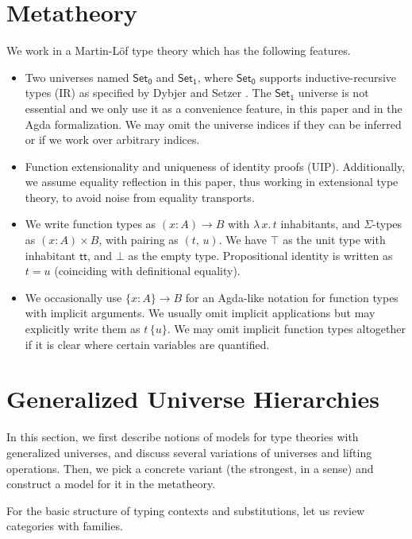\documentclass[a4paper,UKenglish,cleveref, autoref, thm-restate]{lipics-v2021}
\theoremstyle{remark}
\theoremstyle{definition}
\newcommand{\Set}[1]{\mathsf{Set_{#1}}}
\renewcommand{\tt}{\mathsf{tt}}
\begin{document}
\section{Metatheory}
\label{sec:metatheory}

We work in a Martin-Löf type theory which has the following features.
\begin{itemize}
  \item Two universes named $\Set0$ and $\Set1$, where $\Set0$ supports
    inductive-recursive types (IR) as specified by Dybjer and Setzer
    \cite{dybjer99finite}. The $\Set1$ universe is not essential and we only use
    it as a convenience feature, in this paper and in the Agda formalization. We
    may omit the universe indices if they can be inferred or if we work over
    arbitrary indices.
  \item Function extensionality and uniqueness of identity proofs
    (UIP). Additionally, we assume equality reflection in this paper, thus
    working in extensional type theory, to avoid noise from equality transports.
  \item We write function types as $(x : A)\to B$ with $\lambda\,x.\,t$
    inhabitants, and $\Sigma$-types as $(x : A) \times B$, with pairing as
    $(t,\, u)$. We have $\top$ as the unit type with inhabitant $\tt$, and
    $\bot$ as the empty type. Propositional identity is written as $t = u$
    (coinciding with definitional equality).
  \item We occasionally use $\{x : A\} \to B$ for an Agda-like notation for
    function types with implicit arguments. We usually omit implicit
    applications but may explicitly write them as $t\,\{u\}$.  We may omit
    implicit function types altogether if it is clear where certain variables
    are quantified.
\end{itemize}

\section{Generalized Universe Hierarchies}
\label{sec:ttgu}

In this section, we first describe notions of models for type theories with
generalized universes, and discuss several variations of universes and lifting
operations. Then, we pick a concrete variant (the strongest, in a sense)
and construct a model for it in the metatheory.

For the basic structure of typing contexts and substitutions, let us review
categories with families.
\end{document}

